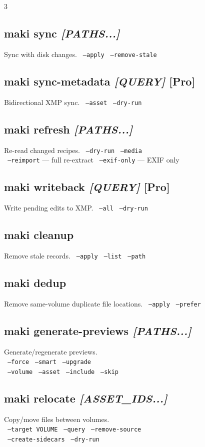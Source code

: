 \documentclass[a4paper,landscape,8pt]{article}
\newcommand{\opt}[1]{\texttt{\scriptsize\color{maki-stone} #1}}
\newcommand{\pro}{\textcolor{maki-teal}{\scriptsize [Pro]}}
\begin{document}
\begin{multicols}{3}
\subsection{maki sync \textit{[PATHS...]}}
Sync with disk changes. \opt{--apply} \opt{--remove-stale}

\subsection{maki sync-metadata \textit{[QUERY]} \pro}
Bidirectional XMP sync. \opt{--asset} \opt{--dry-run}

\subsection{maki refresh \textit{[PATHS...]}}
Re-read changed recipes. \opt{--dry-run} \opt{--media} \\
\opt{--reimport} — full re-extract \opt{--exif-only} — EXIF only

\subsection{maki writeback \textit{[QUERY]} \pro}
Write pending edits to XMP. \opt{--all} \opt{--dry-run}

\subsection{maki cleanup}
Remove stale records. \opt{--apply} \opt{--list} \opt{--path}

\subsection{maki dedup}
Remove same-volume duplicate file locations. \opt{--apply} \opt{--prefer}

\subsection{maki generate-previews \textit{[PATHS...]}}
Generate/regenerate previews. \\
\opt{--force} \opt{--smart} \opt{--upgrade} \\
\opt{--volume} \opt{--asset} \opt{--include} \opt{--skip}

\subsection{maki relocate \textit{[ASSET\_IDS...]}}
Copy/move files between volumes. \\
\opt{--target VOLUME} \opt{--query} \opt{--remove-source} \\
\opt{--create-sidecars} \opt{--dry-run}


\end{multicols}
\end{document}
